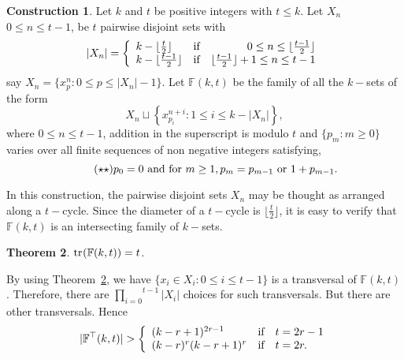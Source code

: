 \documentclass[a4paper,reqno,10pt]{amsart}
\newtheorem{theorem}{Theorem}[section]
\theoremstyle{definition}
\newtheorem{construction}[theorem]{Construction}
\begin{document}
\begin{construction}\label{F(k,t)}
Let $k$ and $t$ be positive integers with $t\leq k$. Let $X_{n}$ $0\leq n\leq t-1$, be $t$ pairwise disjoint sets with  
\begin{align*}
|X_{n}|=\left\{\begin{array}{lcr}
                k-\lfloor\frac{t}{2}\rfloor & \textnormal{if} & 0\leq n\leq\lfloor\frac{t-1}{2}\rfloor\\
                k-\lfloor\frac{t-1}{2}\rfloor & \textnormal{if} & \lfloor\frac{t-1}{2}\rfloor+1\leq n\leq t-1
            \end{array}\right.
\end{align*}
say $X_{n}=\{x^{n}_{p}:0\leq p\leq |X_{n}|-1\}$. Let $\mathbb{F}(k,t)$ be the family of all the $k-$sets of the form 
\begin{equation*}
X_{n}\sqcup\left\{x^{n+i}_{p_{i}}:1\leq i\leq k-|X_{n}|\right\},
\end{equation*}
where $0\leq n\leq t-1$, addition in the superscript is modulo $t$ and $\{p_{m}:m\geq 0\}$ varies over all finite sequences of non negative integers satisfying,  
\begin{equation}\label{definition_p_n}\tag{$\star\star$}
p_{0}=0\textup{ and for }m\geq1, p_{m}=p_{m-1}\textup{ or } 1+p_{m-1}.   
\end{equation}
\end{construction}

In this construction, the pairwise disjoint sets $X_{n}$ may be thought as arranged along a $t-$cycle. Since the diameter of a $t-$cycle is $\lfloor\frac{t}{2}\rfloor$, it is easy to verify that $\mathbb{F}(k,t)$ is an intersecting family of $k-$sets.

\begin{theorem}\label{trF(k,t)}
${\ensuremath{{\textnormal{tr}}_{}({\mathbb{F}(k,t)})}}=t$.
\end{theorem}

By using Theorem~\ref{trF(k,t)}, we have $\{x_{i}\in X_{i}:0\leq i\leq t-1\}$ is a transversal of $\mathbb{F}(k,t)$.
Therefore, there are $\overset{t-1}{\underset{i=0}\prod}|X_{i}|$ choices for such transversals. But there are other transversals. Hence
\begin{align*}
|\mathbb{F}^{\top}(k,t)|>\left\{\begin{array}{lcl}
                (k-r+1)^{2r-1} & \textnormal{if} & t=2r-1\\
                (k-r)^{r}(k-r+1)^{r} & \textnormal{if} & t=2r.
            \end{array}\right.
\end{align*}
\end{document}
